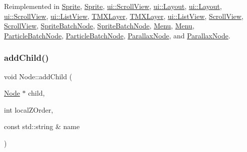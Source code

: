 Reimplemented in \hyperlink{classSprite_af91733127ca0e09dd0a36c78c62ff099}{Sprite}, \hyperlink{classSprite_aad4985d58ef1bcd5bb0a21ad0601ebce}{Sprite}, \hyperlink{classui_1_1ScrollView_ad0b88c4c9c3b6579167a115cd72d4d56}{ui\+::\+Scroll\+View}, \hyperlink{classui_1_1Layout_af456e16a833450c52982b487d97b7134}{ui\+::\+Layout}, \hyperlink{classui_1_1Layout_a26b16c7813db3140be62bad81c20a1f1}{ui\+::\+Layout}, \hyperlink{classui_1_1ScrollView_a1843e13af3409763de103e52eb28f3bd}{ui\+::\+Scroll\+View}, \hyperlink{classui_1_1ListView_aee4869d9b2ca6d88b5075f9078853644}{ui\+::\+List\+View}, \hyperlink{classTMXLayer_a6967088f51d0ad613c639b2592692116}{T\+M\+X\+Layer}, \hyperlink{classTMXLayer_a8f537dd4690c31ee1a61413c9bfcaa94}{T\+M\+X\+Layer}, \hyperlink{classui_1_1ListView_a9963ad5969a99d1e67694cfb926f56cc}{ui\+::\+List\+View}, \hyperlink{classScrollView_a251eb14f9abefa4c10ab4d0602b107c1}{Scroll\+View}, \hyperlink{classScrollView_a36cedf4f110c025a6fc1196f6db3cd44}{Scroll\+View}, \hyperlink{classSpriteBatchNode_a512bd0b1e1bd2741a99bff3997fcbbd6}{Sprite\+Batch\+Node}, \hyperlink{classSpriteBatchNode_a4d84535b9cdc98d8cfbb8d978f84fc93}{Sprite\+Batch\+Node}, \hyperlink{classMenu_aa28d64c32649091ea83bf2da673f8bdf}{Menu}, \hyperlink{classMenu_a540593eb7fb7de286fe64d6da9c67618}{Menu}, \hyperlink{classParticleBatchNode_aeaefc79b9a891df138679763791b5ac1}{Particle\+Batch\+Node}, \hyperlink{classParticleBatchNode_ae64b2ef0a26f90c90b7afd090ea12825}{Particle\+Batch\+Node}, \hyperlink{classParallaxNode_a5af09336b4d7f4d25f12d7ddf42a5a9c}{Parallax\+Node}, and \hyperlink{classParallaxNode_ad6094cbe40bd10724b586e136edfed4b}{Parallax\+Node}.

\mbox{\label{classNode_abed32867e81e7902c8155dca7d347a18}} 
\subsubsection{\texorpdfstring{add\+Child()}{addChild()}\hspace{0.1cm}{\footnotesize\ttfamily [6/8]}}
{\footnotesize\ttfamily void Node\+::add\+Child (\begin{DoxyParamCaption}\item[{\hyperlink{classNode}{Node} $\ast$}]{child,  }\item[{int}]{local\+Z\+Order,  }\item[{const std\+::string \&}]{name }\end{DoxyParamCaption})\hspace{0.3cm}{\ttfamily [virtual]}}

